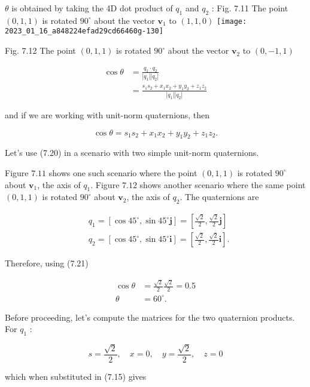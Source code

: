 $\theta$ is obtained by taking the 4D dot product of $q_{1}$ and $q_{2}$ : Fig. 7.11 The point $(0,1,1)$ is rotated $90^{\circ}$ about the vector $\mathbf{v}_{1}$ to $(1,1,0)$
\texttt{[image: 2023\_01\_16\_a848224efad29cd66460g-130]}

Fig. 7.12 The point $(0,1,1)$ is rotated $90^{\circ}$ about the vector $\mathbf{v}_{2}$ to $(0,-1,1)$

$$
\begin{aligned}
\cos \theta & =\frac{q_{1} \cdot q_{2}}{\left|q_{1}\right|\left|q_{2}\right|} \\
& =\frac{s_{1} s_{2}+x_{1} x_{2}+y_{1} y_{2}+z_{1} z_{2}}{\left|q_{1}\right|\left|q_{2}\right|}
\end{aligned}
$$

and if we are working with unit-norm quaternions, then

$$
\cos \theta=s_{1} s_{2}+x_{1} x_{2}+y_{1} y_{2}+z_{1} z_{2} .
$$

Let's use (7.20) in a scenario with two simple unit-norm quaternions.

Figure $7.11$ shows one such scenario where the point $(0,1,1)$ is rotated $90^{\circ}$ about $\mathbf{v}_{1}$, the axis of $q_{1}$. Figure $7.12$ shows another scenario where the same point $(0,1,1)$ is rotated $90^{\circ}$ about $\mathbf{v}_{2}$, the axis of $q_{2}$. The quaternions are

$$
\begin{aligned}
& q_{1}=\left[\cos 45^{\circ}, \sin 45^{\circ} \mathbf{j}\right]=\left[\frac{\sqrt{2}}{2}, \frac{\sqrt{2}}{2} \mathbf{j}\right] \\
& q_{2}=\left[\cos 45^{\circ}, \sin 45^{\circ} \mathbf{i}\right]=\left[\frac{\sqrt{2}}{2}, \frac{\sqrt{2}}{2} \mathbf{i}\right] .
\end{aligned}
$$

Therefore, using (7.21)

$$
\begin{aligned}
\cos \theta & =\frac{\sqrt{2}}{2} \frac{\sqrt{2}}{2}=0.5 \\
\theta & =60^{\circ} .
\end{aligned}
$$

Before proceeding, let's compute the matrices for the two quaternion products. For $q_{1}$ :

$$
s=\frac{\sqrt{2}}{2}, \quad x=0, \quad y=\frac{\sqrt{2}}{2}, \quad z=0
$$

which when substituted in (7.15) gives

